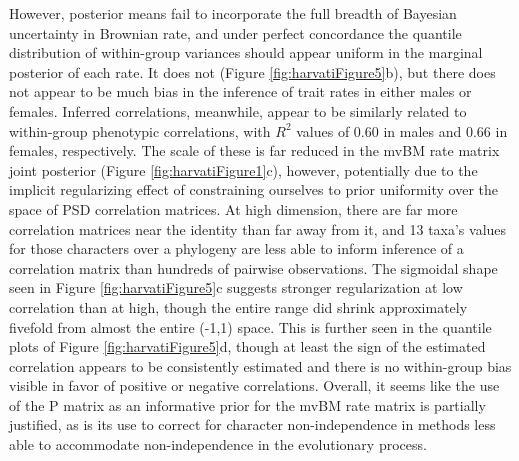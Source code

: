 However, posterior means fail to incorporate the full breadth of Bayesian uncertainty in Brownian rate, and under perfect concordance the quantile distribution of within-group variances should appear uniform in the marginal posterior of each rate. It does not (Figure \ref{fig:harvatiFigure5}b), but there does not appear to be much bias in the inference of trait rates in either males or females. Inferred correlations, meanwhile, appear to be similarly related to within-group phenotypic correlations, with $R^2$ values of 0.60 in males and 0.66 in females, respectively. The scale of these is far reduced in the mvBM rate matrix joint posterior (Figure \ref{fig:harvatiFigure1}c), however, potentially due to the implicit regularizing effect of constraining ourselves to prior uniformity over the space of PSD correlation matrices. At high dimension, there are far more correlation matrices near the identity than far away from it, and 13 taxa's values for those characters over a phylogeny are less able to inform inference of a correlation matrix than hundreds of pairwise observations. The sigmoidal shape seen in Figure \ref{fig:harvatiFigure5}c suggests stronger regularization at low correlation than at high, though the entire range did shrink approximately fivefold from almost the entire (-1,1) space. This is further seen in the quantile plots of Figure \ref{fig:harvatiFigure5}d, though at least the sign of the estimated correlation appears to be consistently estimated and there is no within-group bias visible in favor of positive or negative correlations. Overall, it seems like the use of the P matrix as an informative prior for the mvBM rate matrix is partially justified, as is its use to correct for character non-independence in methods less able to accommodate non-independence in the evolutionary process.

